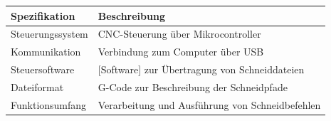 \begin{table}[ht]
	\centering
	\begin{tabular}{|p{6cm}|p{8cm}|}
		\hline
		\textbf{Spezifikation} & \textbf{Beschreibung} \\ \hline
		
		Steuerungssystem & CNC-Steuerung über Mikrocontroller \\ \hline
		
		Kommunikation & Verbindung zum Computer über USB \\ \hline
		
		Steuersoftware & [Software] zur Übertragung von Schneiddateien \\ \hline
		
		Dateiformat & G-Code zur Beschreibung der Schneidpfade \\ \hline
		
		Funktionsumfang & Verarbeitung und Ausführung von Schneidbefehlen \\ \hline
		
	\end{tabular}
\end{table}